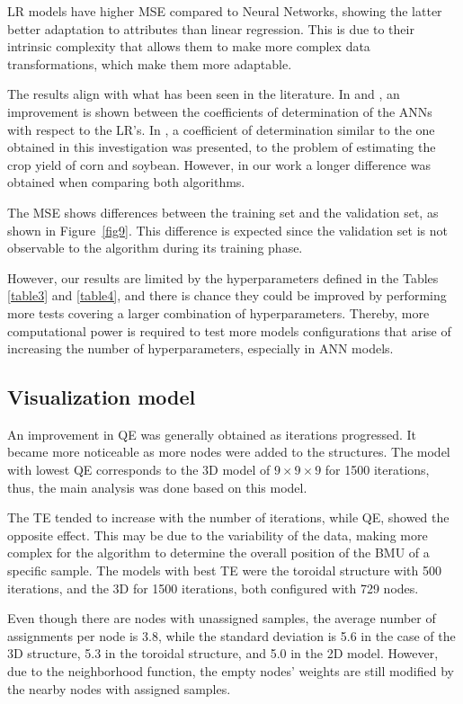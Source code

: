 \documentclass[conference]{IEEEtran}
\begin{document}
LR models have higher MSE compared to Neural Networks, showing the latter better adaptation to attributes than linear regression. This is due to their intrinsic complexity that allows them to make more complex data transformations, which make them more adaptable.

The results align with what has been seen in the literature. In \cite{application_of_bhering} and \cite{artificial_neural_kaul}, an improvement is shown between the coefficients of determination of the ANNs with respect to the LR's.  In \cite{artificial_neural_kaul}, a coefficient of determination similar to the one obtained in this investigation was presented, to the problem of estimating the crop yield of corn and soybean. However, in our work a longer difference was obtained when comparing both algorithms.

The MSE shows differences between the training set and the validation set, as shown in Figure~\ref{fig9}. This difference is expected since the validation set is not observable to the algorithm during its training phase.

However, our results are limited by the hyperparameters defined in the Tables \ref{table3} and \ref{table4}, and there is chance they could be improved by performing more tests covering a larger combination of hyperparameters. Thereby, more computational power is required to test more models configurations that arise of increasing the number of hyperparameters, especially in ANN models. 

\subsection{Visualization model}

An improvement in QE was generally obtained as iterations progressed. It became more noticeable as more nodes were added to the structures. The model with lowest QE corresponds to the 3D model of $9\times9\times9$ for 1500 iterations, thus, the main analysis was done based on this model.

The TE tended to increase with the number of iterations, while QE, showed the opposite effect. This may be due to the variability of the data, making more complex for the algorithm to determine the overall position of the BMU of a specific sample. The models with best TE were the toroidal structure with 500 iterations, and the 3D for 1500 iterations, both configured with 729 nodes.

Even though there are nodes with unassigned samples, the average number of assignments per node is 3.8, while the standard deviation is 5.6 in the case of the 3D structure, 5.3 in the toroidal structure, and 5.0 in the 2D model. However, due to the neighborhood function, the empty nodes' weights are still modified by the nearby nodes with assigned samples.
\end{document}
